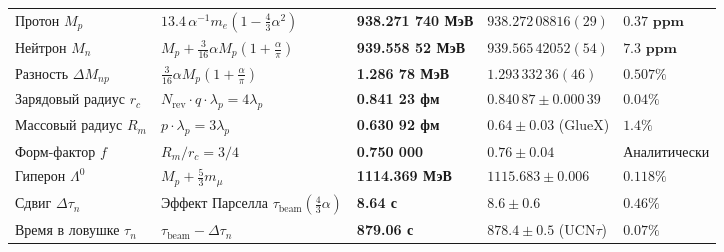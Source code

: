 \documentclass[11pt,a4paper]{article}
\theoremstyle{definition}
\theoremstyle{remark}
\begin{document}
\begin{xltabular}{\textwidth}{>{\raggedright\arraybackslash}p{3.2cm} X >{\centering\arraybackslash}p{2.7cm} >{\centering\arraybackslash}p{3.0cm} >{\raggedleft\arraybackslash}p{2.1cm}}
 \\
\midrule
Протон $M_p$ & $13.4 \, \alpha^{-1} m_e (1 - \frac{4}{3}\alpha^2)$ & \textbf{938.271 740 МэВ} & $938.272\,08816(29)$ & $\mathbf{0.37\text{ ppm}}$ \\
Нейтрон $M_n$ & $M_p + \frac{3}{16}\alpha M_p (1+\frac{\alpha}{\pi})$ & \textbf{939.558 52 МэВ} & $939.565\,42052(54)$ & $\mathbf{7.3\text{ ppm}}$ \\
Разность $\Delta M_{np}$ & $\frac{3}{16}\alpha M_p (1+\frac{\alpha}{\pi})$ & \textbf{1.286 78 МэВ} & $1.293\,332\,36(46)$ & $0.507\%$ \\
Зарядовый радиус $r_c$ & $N_{\mathrm{rev}} \cdot q \cdot \lambda_p = 4\lambda_p$ & \textbf{0.841 23 фм} & $0.840\,87 \pm 0.000\,39$ & $0.04\%$ \\
Массовый радиус $R_m$ & $p \cdot \lambda_p = 3\lambda_p$ & \textbf{0.630 92 фм} & $0.64 \pm 0.03$ (GlueX) & $1.4\%$ \\
Форм-фактор $f$ & $R_m / r_c = 3/4$ & \textbf{0.750 000} & $0.76 \pm 0.04$ & Аналитически \\
Гиперон $\Lambda^0$ & $M_p + \frac{5}{3} m_\mu$ & \textbf{1114.369 МэВ} & $1115.683 \pm 0.006$ & $0.118\%$ \\
Сдвиг $\Delta\tau_n$ & Эффект Парселла $\tau_{\mathrm{beam}}(\frac{4}{3}\alpha)$ & \textbf{8.64 с} & $8.6 \pm 0.6$ & $0.46\%$ \\
Время в ловушке $\tau_n$ & $\tau_{\mathrm{beam}} - \Delta\tau_n$ & \textbf{879.06 с} & $878.4 \pm 0.5$ ($\mathrm{UCN}\tau$) & $0.07\%$ \\
\midrule


\end{xltabular}
\end{document}
